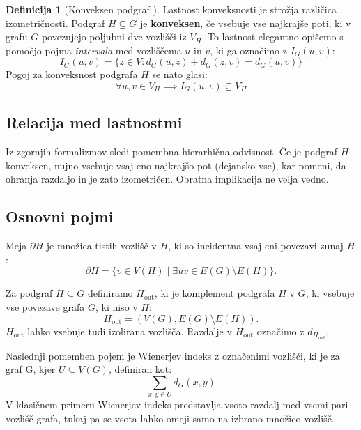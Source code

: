 \documentclass[sigconf
]{acmart}
\theoremstyle{definition}
\newtheorem{definition}{Definicija}[section]
\begin{document}
\begin{definition}[Konveksen podgraf \cite{imrich2000}]
Lastnost konveksnosti je strožja različica izometričnosti. Podgraf $H \subseteq G$ je \textbf{konveksen}, če vsebuje vse najkrajše poti, ki v grafu $G$ povezujejo poljubni dve vozlišči iz $V_H$. To lastnost elegantno opišemo s pomočjo pojma \textit{intervala} med vozliščema $u$ in $v$, ki ga označimo z $I_G(u, v)$:
\begin{equation}
    I_G(u, v) = \{ z \in V : d_G(u, z) + d_G(z, v) = d_G(u, v) \}
\end{equation}
Pogoj za konveksnost podgrafa $H$ se nato glasi:
\begin{equation}
    \forall u, v \in V_H \implies I_G(u, v) \subseteq V_H
\end{equation}
\end{definition}

\subsection{Relacija med lastnostmi}
Iz zgornjih formalizmov sledi pomembna hierarhična odvisnost. Če je podgraf $H$ konveksen, nujno vsebuje vsaj eno najkrajšo pot (dejansko vse), kar pomeni, da ohranja razdaljo in je zato izometričen. Obratna implikacija ne velja vedno.

\subsection{Osnovni pojmi}
\label{basic_concepts}
Meja $\partial H$ je množica tistih vozlišč v $H$, ki so incidentna vsaj eni povezavi zunaj $H$:
\begin{equation}
    \partial H = \{v \in V(H) \mid \exists uv \in E(G)\setminus E(H)\}.
\end{equation}

Za podgraf $H \subseteq G$ definiramo $H_{\mathrm{out}}$, ki je komplement podgrafa $H$ v $G$, ki vsebuje vse povezave grafa $G$, ki niso v $H$:
\begin{equation}
    H_{\mathrm{out}} = (V(G), E(G)\setminus E(H)).
\end{equation}
$H_{\mathrm{out}}$ lahko vsebuje tudi izolirana vozlišča. Razdalje v $H_{\mathrm{out}}$ označimo z $d_{H_{\mathrm{out}}}$.

Naslednji pomemben pojem je Wienerjev indeks z označenimi vozlišči, ki je za graf G, kjer $U \subseteq V(G)$, definiran kot:
\begin{equation}
    \sum_{x,y \in U} d_G(x,y)
\end{equation}
V klasičnem primeru Wienerjev indeks predstavlja vsoto razdalj med vsemi pari vozlišč grafa, tukaj pa se vsota lahko omeji samo na izbrano množico vozlišč.
\end{document}
